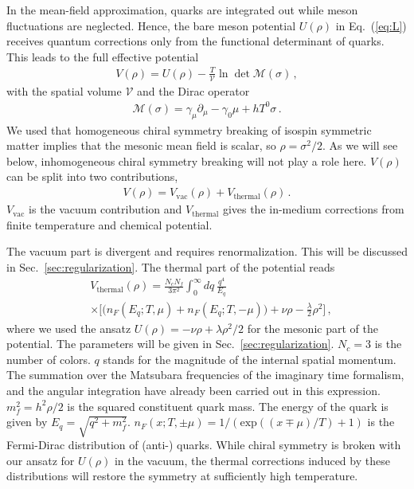 \documentclass[reprint,english,superscriptaddress,preprintnumbers,amsmath,amssymb,aps,prd]{revtex4-2}
\def\Eq#1{Eq.~(\ref{#1})}
\def\Sec#1{Sec.~\ref{#1}}
\begin{document}
In the mean-field approximation, quarks are integrated out while meson fluctuations are neglected. Hence, the bare meson potential $U(\rho)$ in \Eq{eq:L} receives quantum corrections only from the functional determinant of quarks. This leads to the full effective potential
\begin{align}\label{eq:vdet}
V(\rho) = U(\rho) - \frac{T}{\mathcal{V}} \ln\det \mathcal{M}(\sigma)\,,
\end{align}
with the spatial volume $\mathcal{V}$ and the Dirac operator
\begin{align}
\mathcal{M}(\sigma) = \gamma_\mu\partial_\mu - \gamma_0\mu + h T^0 \sigma\,.
\end{align}
We used that homogeneous chiral symmetry breaking of isospin symmetric matter implies that the mesonic mean field is scalar, so $\rho = \sigma^2/2$. As we will see below, inhomogeneous chiral symmetry breaking will not play a role here. $V(\rho)$ can be split into two contributions,
%
\begin{align}
V(\rho)=V_{\mathrm{vac}}(\rho)+V_{\mathrm{thermal}}(\rho)\,.\label{eq:ep}
\end{align}
%
$V_{\mathrm{vac}}$ is the vacuum contribution and $V_{\mathrm{thermal}}$ gives the in-medium corrections from finite temperature and chemical potential. 

The vacuum part is divergent and requires renormalization. This will be discussed in \Sec{sec:regularization}. The thermal part of the potential reads
%
\begin{align}
&V_{\mathrm{thermal}}(\rho)=\frac{N_cN_f}{3\pi^2}\int_0^\infty\! dq \,\frac{q^4}{E_q}\nonumber\\[2ex]
&\times\bigg[\big(n_F(E_q;T,\mu)+n_F(E_q;T,-\mu)\big)+\nu\rho-\frac{\lambda}{2}\rho^2\bigg]\,,\label{eq:ep_thermal}
\end{align}
%
where we used the ansatz $U(\rho) = -\nu\rho+\lambda\rho^2/2$ for the mesonic part of the potential. The parameters will be given in \Sec{sec:regularization}. $N_c=3$ is the number of colors.  $q$ stands for the magnitude of the internal spatial momentum. The summation over the Matsubara frequencies of the imaginary time formalism, and the angular integration have already been carried out in this expression. $m_f^2=h^2\rho/2$ is the squared constituent quark mass. The energy of the quark is given by $E_q=\sqrt{q^2+m_f^2}$. $n_F(x;T,\pm\mu)=1/(\mathrm{exp}((x\mp\mu)/T)+1)$ is the Fermi-Dirac distribution of (anti-) quarks. While chiral symmetry is broken with our ansatz for $U(\rho)$ in the vacuum, the thermal corrections induced by these distributions will restore the symmetry at sufficiently high temperature.
\end{document}
